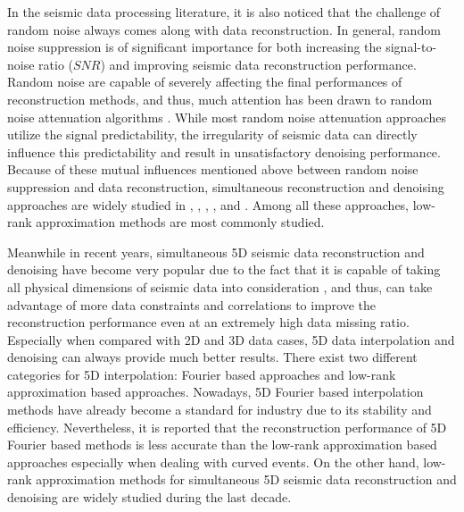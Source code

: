 In the seismic data processing literature, it is also noticed that the challenge of random noise always comes along with data reconstruction. In general, random noise suppression is of significant importance for both increasing the signal-to-noise ratio ($SNR$) \cite{yangkang2015ortho} and improving seismic data reconstruction performance. Random noise are capable of severely affecting the final performances of reconstruction methods, and thus, much attention has been drawn to random noise attenuation algorithms \cite{guochang2012,fxnaghizadeh,beckouche,yangkang2015ortho}. While most random noise attenuation approaches utilize the signal predictability, the irregularity of seismic data can directly influence this predictability and result in unsatisfactory denoising performance. Because of these mutual influences mentioned above between random noise suppression and data reconstruction, simultaneous reconstruction and denoising approaches are widely studied in \cite{oropezamssa}, \cite{gaomssa}, \cite{Gaogp}, \cite{gholami}, \cite{benfengpocs} and \cite{pmf}. Among all these approaches, low-rank approximation methods are most commonly studied. 

Meanwhile in recent years, simultaneous 5D seismic data reconstruction and denoising have become very popular due to the fact that it is capable of taking all physical dimensions of seismic data into consideration \cite{Liubin2004, Trad2007, Trad2009}, and thus, can take advantage of more data constraints and correlations to improve the reconstruction performance even at an extremely high data missing ratio. Especially when compared with 2D and 3D data cases, 5D data interpolation and denoising can always provide much better results. There exist two different categories for 5D interpolation: Fourier based approaches and low-rank approximation based approaches. Nowadays, 5D Fourier based interpolation methods have already become a standard for industry due to its stability and efficiency. Nevertheless, it is reported that the reconstruction performance of 5D Fourier based methods is less accurate than the low-rank approximation based approaches especially when dealing with curved events. On the other hand, low-rank approximation methods for simultaneous 5D seismic data reconstruction and denoising are widely studied during the last decade.

